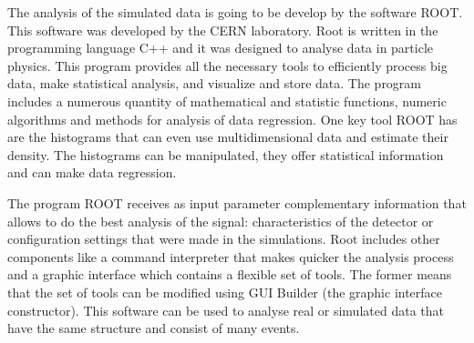 The analysis of the simulated data is going to be develop by the software ROOT. This software was developed by the CERN laboratory. Root is written in the programming language C++ and it was 
designed to analyse data in particle physics. This program provides all the necessary tools to efficiently process big data, make statistical analysis, and visualize and store data. The program 
includes a numerous quantity of mathematical and statistic functions, numeric algorithms and methods for analysis of data regression. One key tool ROOT has are the histograms that can even use multidimensional data and estimate their density. The histograms can be manipulated, they offer statistical information and can make data regression. 

The program ROOT receives as input parameter complementary information that allows to do the best analysis of the signal: characteristics of the detector or configuration settings that were made in the simulations. Root includes other components like a command interpreter that makes quicker the analysis process and a graphic interface which contains a flexible set of tools. The former means that the set of tools can be modified using GUI Builder (the graphic interface constructor). This software can be used to analyse real or simulated data that have the same structure and consist of many events. 